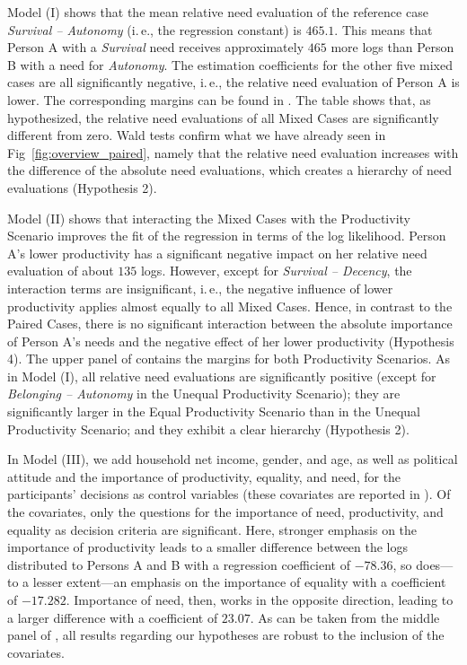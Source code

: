 \documentclass[10pt,letterpaper]{article}
\begin{document}
Model (I) shows that the mean relative need evaluation of the reference case \textit{Survival -- Autonomy} (i.\,e., the regression constant) is $465.1$.
This means that Person A with a \textit{Survival} need receives approximately $465$ more logs than Person B with a need for \textit{Autonomy}.
The estimation coefficients for the other five mixed cases are all significantly negative, i.\,e., the relative need evaluation of Person A is lower.
The corresponding margins can be found in .
The table shows that, as hypothesized, the relative need evaluations of all Mixed Cases are significantly different from zero.
Wald tests confirm what we have already seen in Fig~\ref{fig:overview_paired}, namely that the relative need evaluation increases with the difference of the absolute need evaluations, which creates a hierarchy of need evaluations (Hypothesis 2).

Model (II) shows that interacting the Mixed Cases with the Productivity Scenario improves the fit of the regression in terms of the log likelihood.
Person A's lower productivity has a significant negative impact on her relative need evaluation of about $135$ logs.
However, except for \textit{Survival -- Decency}, the interaction terms are insignificant, i.\,e., the negative influence of lower productivity applies almost equally to all Mixed Cases.
Hence, in contrast to the Paired Cases, there is no significant interaction between the absolute importance of Person A's needs and the negative effect of her lower productivity (Hypothesis 4).
The upper panel of  contains the margins for both Productivity Scenarios.
As in Model (I), all relative need evaluations are significantly positive (except for \textit{Belonging -- Autonomy} in the Unequal Productivity Scenario); they are significantly larger in the Equal Productivity Scenario than in the Unequal Productivity Scenario; and they exhibit a clear hierarchy (Hypothesis 2).

In Model (III), we add household net income, gender, and age, as well as political attitude and the importance of productivity, equality, and need, for the participants' decisions as control variables (these covariates are reported in ).
Of the covariates, only the questions for the importance of need, productivity, and equality as decision criteria are significant.
Here, stronger emphasis on the importance of productivity leads to a smaller difference between the logs distributed to Persons A and B with a regression coefficient of $-78.36$, so does---to a lesser extent---an emphasis on the importance of equality with a coefficient of $-17.282$.
Importance of need, then, works in the opposite direction, leading to a larger difference with a coefficient of $23.07$.
As can be taken from the middle panel of , all results regarding our hypotheses are robust to the inclusion of the covariates.
\end{document}
